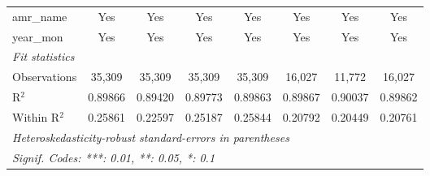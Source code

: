 \begin{table}[htbp]
\begin{tabular}{lccccccc}
      amr\_name                                  & Yes            & Yes            & Yes            & Yes            & Yes            & Yes                    & Yes\\  
      year\_mon                                  & Yes            & Yes            & Yes            & Yes            & Yes            & Yes                    & Yes\\  
      \midrule
      \emph{Fit statistics}\\
      Observations                               & 35,309         & 35,309         & 35,309         & 35,309         & 16,027         & 11,772                 & 16,027\\  
      R$^2$                                      & 0.89866        & 0.89420        & 0.89773        & 0.89863        & 0.89867        & 0.90037                & 0.89862\\  
      Within R$^2$                               & 0.25861        & 0.22597        & 0.25187        & 0.25844        & 0.20792        & 0.20449                & 0.20761\\  
      \midrule \midrule
      \multicolumn{8}{l}{\emph{Heteroskedasticity-robust standard-errors in parentheses}}\\
      \multicolumn{8}{l}{\emph{Signif. Codes: ***: 0.01, **: 0.05, *: 0.1}}\\
   \end{tabular}
\end{table}


